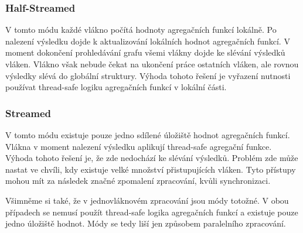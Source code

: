 \subsubsection{Half-Streamed}

V tomto módu každé vlákno počítá hodnoty agregačních funkcí lokálně.
Po nalezení výsledku dojde k aktualizování lokálních hodnot agregačních funkcí.
V moment dokončení prohledávání grafu všemi vlákny dojde ke slévání výsledků vláken.
Vlákno však nebude čekat na ukončení práce ostatních vláken, ale rovnou výsledky slévá do globální struktury.
Výhoda tohoto řešení je vyřazení nutnosti používat thread-safe logiku agregačních funkcí v lokální části.

\subsubsection{Streamed}

V tomto módu existuje pouze jedno sdílené úložiště hodnot agregačních funkcí.
Vlákna v moment nalezení výsledku aplikují thread-safe agregační funkce.
Výhoda tohoto řešení je, že zde nedochází ke slévání výsledků.
Problém zde může nastat ve chvíli, kdy existuje velké množství přistupujících vláken.
Tyto přístupy mohou mít za následek značné zpomalení zpracování, kvůli synchronizaci.

Všimněme si také, že v jednovláknovém zpracování jsou módy totožné.
V obou případech se nemusí použít thread-safe logika agregačních funkcí a existuje pouze jedno úložiště hodnot.
Módy se tedy liší jen způsobem paralelního zpracování.

